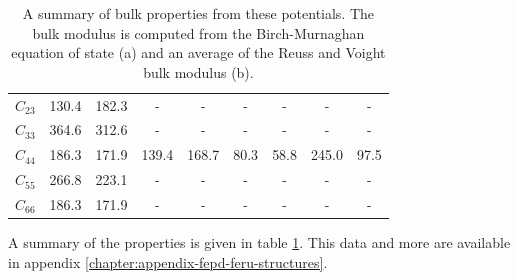 \begin{table}[ht]
{\begin{tabular}{lcccccccc}
$C_{23}$    &  130.4  &  182.3  &  -      &  -      &  -      &  -      &  -      &  -     \\
$C_{33}$    &  364.6  &  312.6  &  -      &  -      &  -      &  -      &  -      &  -     \\
$C_{44}$    &  186.3  &  171.9  &  139.4  &  168.7  &  80.3   &  58.8   &  245.0  &  97.5  \\
$C_{55}$    &  266.8  &  223.1  &  -      &  -      &  -      &  -      &  -      &  -     \\
$C_{66}$    &  186.3  &  171.9  &  -      &  -      &  -      &  -      &  -      &  -     \\
\hline\hline
\end{tabular}%
}
\caption{A summary of bulk properties from these potentials.  The bulk modulus is computed from the Birch-Murnaghan equation of state (a) and an average of the Reuss and Voight bulk modulus (b). }
\label{table:fefccresults}
\end{table}

A summary of the properties is given in table \ref{table:fefccresults}.  This data and more are available in appendix \ref{chapter:appendix-fepd-feru-structures}.





